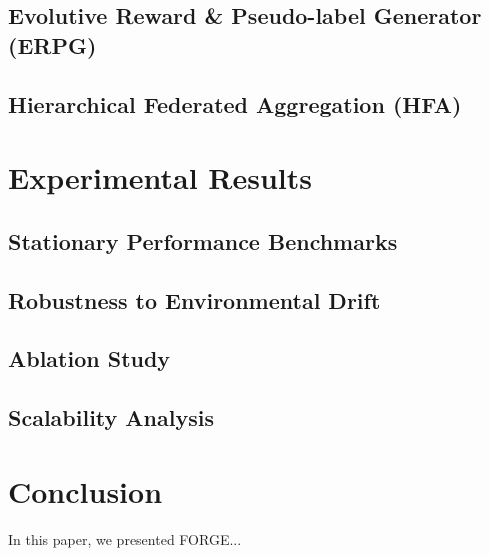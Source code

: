 \documentclass[journal]{IEEEtran}
\begin{document}
\subsection{Evolutive Reward & Pseudo-label Generator (ERPG)}
\subsection{Hierarchical Federated Aggregation (HFA)}

\section{Experimental Results}
\subsection{Stationary Performance Benchmarks}
\subsection{Robustness to Environmental Drift}
\subsection{Ablation Study}
\subsection{Scalability Analysis}

\section{Conclusion}
In this paper, we presented FORGE...



\end{document}
